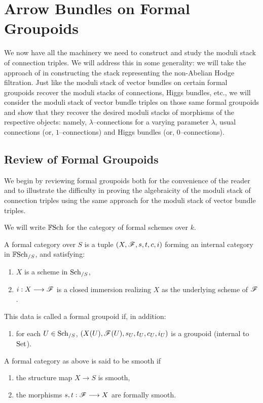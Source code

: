 \documentclass[11pt]{amsart}
\begin{document}

\section{Arrow Bundles on Formal Groupoids}\label{sec:ArrowBunFormalGrpd}

We now have all the machinery we need to construct and study the moduli
stack of connection triples. We will address this in some generality: we will
take the approach of \cites{NonAbHodgeFilt} in constructing the stack
representing the non-Abelian Hodge filtration. Just like the moduli stack
of vector bundles on certain formal groupoids recover the moduli stacks
of connections, Higgs bundles, etc., we will consider
the moduli stack of vector bundle triples on those same formal groupoids
and show that they recover the desired moduli stacks of morphisms
of the respective objects: namely, $\lambda$--connections for a varying
parameter $\lambda$, usual connections (or, $1$--connections) and
Higgs bundles (or, $0$--connections).

\subsection{Review of Formal Groupoids}

We begin by reviewing formal groupoids both for the convenience of the reader
and to illustrate the difficulty in proving the algebraicity of the moduli
stack of connection triples using the same approach for the moduli stack
of vector bundle triples.

\begin{notn}
We will write $\mathbb{F}\mathrm{Sch}$ for the category of formal schemes over $k$.
\end{notn}

\begin{defn}
\label{defn:form-cat}
A formal category over $S$ is a tuple $(X, \mathscr{F}, s, t, c, i)$ forming an
internal category in $\mathbb{F}\mathrm{Sch}_{/S}$, and satisfying:
\begin{enumerate}
\item $X$ is a scheme in $\mathrm{Sch}_{/S}$,
\item $i : X \to \sF$ is a closed immersion realizing $X$ as the underlying
scheme of $\mathscr{F}$.
\end{enumerate}
This data is called a formal groupoid if, in addition:
\begin{enumerate}[resume]
\item for each $U \in \mathrm{Sch}_{/S}$, $(X(U), \mathscr{F}(U), s_U, t_U, c_U, i_U)$
is a groupoid (internal to $\mathrm{Set}$).
\end{enumerate}
A formal category as above is said to be smooth if
\begin{enumerate}[resume]
\item the structure map $X \to S$ is smooth,
\item the morphisms $s, t : \sF \to X$ are formally smooth.
\end{enumerate}
\end{defn}
\end{document}
